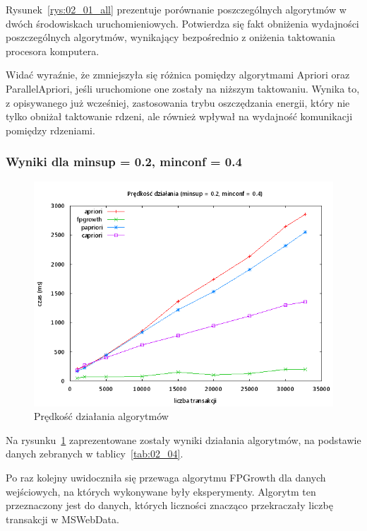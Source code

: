 Rysunek~\ref{rys:02_01_all} prezentuje porównanie poszczególnych algorytmów w dwóch środowiskach uruchomieniowych. Potwierdza się fakt obniżenia wydajności poszczególnych algorytmów, wynikający bezpośrednio z oniżenia taktowania procesora komputera. 

Widać wyraźnie, że zmniejszyła się różnica pomiędzy algorytmami Apriori oraz ParallelApriori, jeśli uruchomione one zostały na niższym taktowaniu. Wynika to, z opisywanego już wcześniej, zastosowania trybu oszczędzania energii, który nie tylko obniżał taktowanie rdzeni, ale również wpływał na wydajność komunikacji pomiędzy rdzeniami.


\subsubsection{Wyniki dla minsup = 0.2, minconf = 0.4}

\begin{figure}[H]
\centering
\includegraphics[width=1.1\textwidth]{figures/06/02_04.png}
\caption{Prędkość działania algorytmów\label{rys:02_04}}
\end{figure}

Na rysunku~\ref{rys:02_04} zaprezentowane zostały wyniki działania algorytmów, na podstawie danych zebranych w tablicy~\ref{tab:02_04}. 

Po raz kolejny uwidoczniła się przewaga algorytmu FPGrowth dla danych wejściowych, na których wykonywane były eksperymenty. Algorytm ten przeznaczony jest do danych, których liczności znacząco przekraczały liczbę transakcji w MSWebData.

